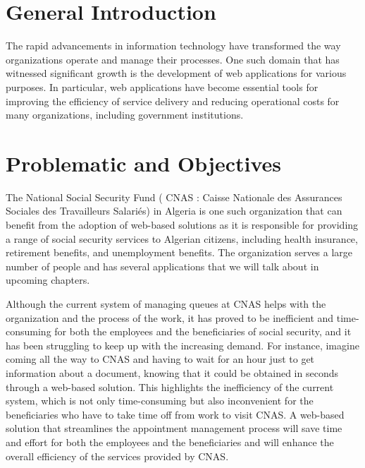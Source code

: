 \section{General Introduction}

The rapid advancements in information technology have transformed the way organizations operate and manage their processes. One such domain that has witnessed significant growth is the development of web applications for various purposes. In particular, web applications have become essential tools for improving the efficiency of service delivery and reducing operational costs for many organizations, including government institutions.

\section{Problematic and Objectives}
The National Social Security Fund ( CNAS : Caisse Nationale des Assurances Sociales des Travailleurs Salariés) in Algeria is one such organization that can benefit from the adoption of web-based solutions as it is responsible for providing a range of social security services to Algerian citizens, including health insurance, retirement benefits, and unemployment benefits. The organization serves a large number of people and has several applications that we will talk about in upcoming chapters. 

Although the current system of managing queues at CNAS helps with the organization and the process of the work, it has proved to be inefficient and time-consuming for both the employees and the beneficiaries of social security, and it has been struggling to keep up with the increasing demand. For instance, imagine coming all the way to CNAS and having to wait for an hour just to get information about a document, knowing that it could be obtained in seconds through a web-based solution. This highlights the inefficiency of the current system, which is not only time-consuming but also inconvenient for the beneficiaries who have to take time off from work to visit CNAS. A web-based solution that streamlines the appointment management process will save time and effort for both the employees and the beneficiaries and will enhance the overall efficiency of the services provided by CNAS.

